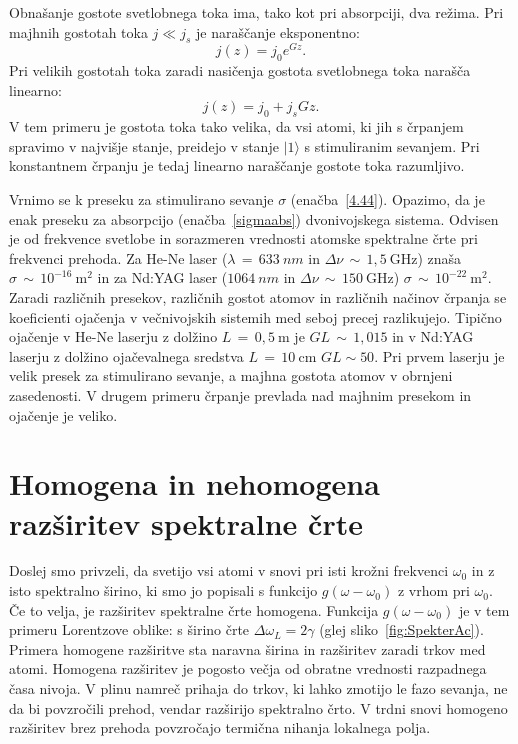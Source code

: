 Obnašanje gostote svetlobnega toka ima, tako kot pri absorpciji, dva režima. 
Pri majhnih gostotah toka $j\ll j_{s}$ je naraščanje eksponentno:
\begin{equation}
j(z)=j_{0}e^{Gz}.
\label{4.45}
\end{equation}
Pri velikih gostotah toka zaradi nasičenja gostota svetlobnega
toka narašča linearno:
\begin{equation}
j(z)=j_{0}+j_{s}Gz.
\label{4.46}
\end{equation}
V tem primeru je gostota toka tako velika, da vsi atomi, ki jih
s črpanjem spravimo v najvišje stanje, preidejo v stanje $|1\rangle$
s stimuliranim sevanjem. Pri konstantnem črpanju je tedaj 
linearno naraščanje gostote toka razumljivo. 

Vrnimo se k preseku za stimulirano sevanje $\sigma$
 (enačba~\ref{4.44}). Opazimo, da je enak preseku za
absorpcijo (enačba~\ref{sigmaabs}) dvonivojskega sistema.
Odvisen je od frekvence svetlobe in sorazmeren vrednosti atomske spektralne 
črte pri frekvenci prehoda. Za He-Ne laser 
($\lambda\,=\,633~\si{nm}$ in $\Delta\nu\,\sim\,1,5~\si{\giga\hertz}$) znaša   
$\sigma\,\sim\,10^{-16}~\si{\metre}^2$ in
za Nd:YAG laser  ($1064~\si{nm}$ in 
$\Delta\nu\,\sim\,150~\si{\giga\hertz}$)
$\sigma\,\sim\,10^{-22}~\si{\metre}^2$.
Zaradi različnih presekov, različnih gostot atomov in različnih načinov črpanja se 
koeficienti ojačenja v večnivojskih sistemih med seboj precej razlikujejo. Tipično
ojačenje v He-Ne laserju z dolžino $L\,=\,0,5~\si{\metre}$ je 
$GL\,\sim\,1,015$ in v Nd:YAG laserju z dolžino ojačevalnega sredstva 
$L\,=\,10~\si{\centi\metre}$ $GL \sim 50$. Pri prvem laserju je 
velik presek za stimulirano sevanje, a majhna gostota atomov v obrnjeni zasedenosti. 
V drugem primeru črpanje prevlada nad majhnim presekom 
in ojačenje je veliko.

\section{Homogena in nehomogena razširitev spektralne črte}
\label{Razsiritev}
Doslej smo privzeli, da svetijo vsi atomi v snovi
pri isti krožni frekvenci $\omega_{0}$ in z isto spektralno širino, ki smo
jo popisali s funkcijo $g(\omega-\omega_0)$ z vrhom pri $\omega_0$. Če to velja, 
je razširitev spektralne črte homogena. 
Funkcija $g(\omega-\omega_0)$ je v tem primeru Lorentzove oblike: 
s širino črte $\Delta \omega_L = 2\gamma$ (glej sliko~\ref{fig:SpekterAc}). 
Primera homogene razširitve sta naravna širina in razširitev zaradi trkov med atomi.
Homogena razširitev je pogosto večja od obratne vrednosti razpadnega časa nivoja. 
V plinu namreč prihaja do trkov, ki lahko zmotijo le fazo sevanja, ne da bi povzročili 
prehod, vendar razširijo spektralno črto. V trdni snovi homogeno razširitev 
brez prehoda povzročajo termična nihanja lokalnega polja. 

